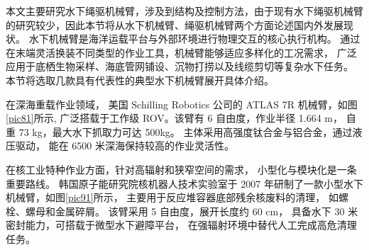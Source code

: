 本文主要研究水下绳驱机械臂，涉及到结构及控制方法，由于现有水下绳驱机械臂的研究较少，因此本节将从水下机械臂、绳驱机械臂两个方面论述国内外发展现状。
水下机械臂是海洋运载平台与外部环境进行物理交互的核心执行机构。
通过在末端灵活换装不同类型的作业工具，机械臂能够适应多样化的工况需求，
广泛应用于底栖生物采样、海底管网铺设、沉物打捞以及线缆剪切等复杂水下任务。
本节将选取几款具有代表性的典型水下机械臂展开具体介绍。

在深海重载作业领域，
美国 Schilling Robotics 公司的 ATLAS 7R 机械臂，如图\ref{pic81}所示,
广泛搭载于工作级 ROV。该臂有 6 自由度，作业半径 1.664 m，
自重 73 kg，最大水下抓取力可达 500kg。
主体采用高强度钛合金与铝合金，通过液压驱动，
能在 6500 米深海保持较高的作业灵活性。


在核工业特种作业方面，针对高辐射和狭窄空间的需求，
小型化与模块化是一条重要路线。
韩国原子能研究院核机器人技术实验室于 2007 年研制了一款小型水下机械臂，如图\ref{pic91}所示，
主要用于反应堆容器底部残余核废料的清理，
如螺栓、螺母和金属碎屑。
该臂采用 5 自由度，展开长度约 60 cm，
具备水下 30 米密封能力，可搭载于微型水下避障平台，
在强辐射环境中替代人工完成高危清理任务。

